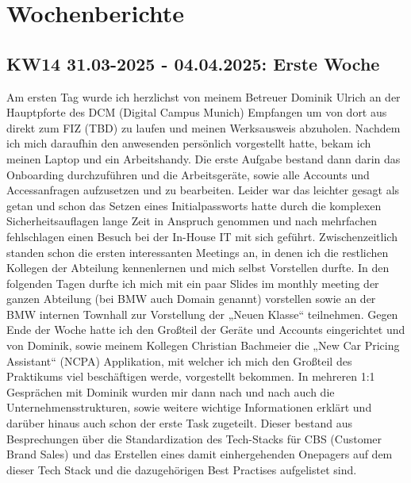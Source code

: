 \section{Wochenberichte}
\subsection{KW14 31.03-2025 - 04.04.2025: Erste Woche}
Am ersten Tag wurde ich herzlichst von meinem Betreuer Dominik Ulrich an der Hauptpforte des DCM (Digital Campus Munich) Empfangen um von dort aus direkt zum FIZ (TBD) zu laufen und meinen Werksausweis abzuholen. 
Nachdem ich mich daraufhin den anwesenden persönlich vorgestellt hatte, bekam ich meinen Laptop und ein Arbeitshandy. 
Die erste Aufgabe bestand dann darin das Onboarding durchzuführen und die Arbeitsgeräte, sowie alle Accounts und Accessanfragen aufzusetzen und zu bearbeiten. 
Leider war das leichter gesagt als getan und schon das Setzen eines Initialpassworts hatte durch die komplexen Sicherheitsauflagen lange Zeit in Anspruch genommen und nach mehrfachen fehlschlagen einen Besuch bei der In-House IT mit sich geführt. 
Zwischenzeitlich standen schon die ersten interessanten Meetings an, in denen ich die restlichen Kollegen der Abteilung kennenlernen und mich selbst Vorstellen durfte. 
In den folgenden Tagen durfte ich mich mit ein paar Slides im monthly meeting der ganzen Abteilung (bei BMW auch Domain genannt) vorstellen sowie an der BMW internen Townhall zur Vorstellung der „Neuen Klasse“ teilnehmen. 
Gegen Ende der Woche hatte ich den Großteil der Geräte und Accounts eingerichtet und von Dominik, sowie meinem Kollegen Christian Bachmeier die „New Car Pricing Assistant“ (NCPA) Applikation, mit welcher ich mich den Großteil des Praktikums viel beschäftigen werde, vorgestellt bekommen. 
In mehreren 1:1 Gesprächen mit Dominik wurden mir dann nach und nach auch die Unternehmensstrukturen, sowie weitere wichtige Informationen erklärt und darüber hinaus auch schon der erste Task zugeteilt. 
Dieser bestand aus Besprechungen über die Standardization des Tech-Stacks für CBS (Customer Brand Sales) und das Erstellen eines damit einhergehenden Onepagers auf dem dieser Tech Stack und die dazugehörigen Best Practises aufgelistet sind.


